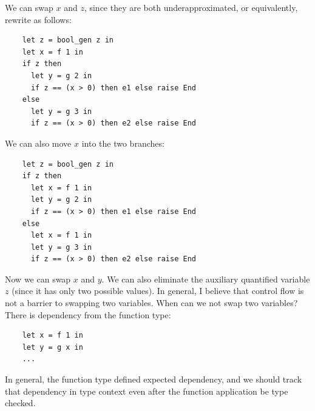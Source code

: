 We can swap $x$ and $z$, since they are both underapproximated, or equivalently, rewrite as follows:
\begin{verbatim}
    let z = bool_gen z in
    let x = f 1 in
    if z then
      let y = g 2 in
      if z == (x > 0) then e1 else raise End
    else
      let y = g 3 in
      if z == (x > 0) then e2 else raise End
\end{verbatim}
We can also move $x$ into the two branches:
\begin{verbatim}
    let z = bool_gen z in
    if z then
      let x = f 1 in
      let y = g 2 in
      if z == (x > 0) then e1 else raise End
    else
      let x = f 1 in
      let y = g 3 in
      if z == (x > 0) then e2 else raise End
\end{verbatim}
Now we can swap $x$ and $y$. We can also eliminate the auxiliary quantified variable $z$ (since it has only two possible values). In general, I believe that control flow is not a barrier to swapping two variables.
When can we not swap two variables? There is dependency from the function type:
\begin{verbatim}
    let x = f 1 in
    let y = g x in
    ...
\end{verbatim}
In general, the function type defined expected dependency, and we should track that dependency in type context even after the function application be type checked.


